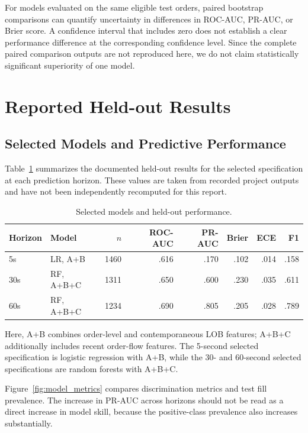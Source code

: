 \documentclass[11pt,a4paper]{article}
\begin{document}
For models evaluated on the same eligible test orders, paired
bootstrap comparisons can quantify uncertainty in differences
in ROC-AUC, PR-AUC, or Brier score. A confidence interval that
includes zero does not establish a clear performance difference
at the corresponding confidence level. Since the complete
paired comparison outputs are not reproduced here, we do not
claim statistically significant superiority of one model.

\section{Reported Held-out Results}

\subsection{Selected Models and Predictive Performance}

Table~\ref{tab:heldout_results} summarizes the documented
held-out results for the selected specification at each
prediction horizon. These values are taken from recorded
project outputs and have not been independently recomputed
for this report.

\begin{table}[htbp]
\centering
\caption{Selected models and held-out performance.}
\label{tab:heldout_results}
\small
\setlength{\tabcolsep}{4pt}
\begin{tabular}{llrrrrrr}
\toprule
Horizon & Model & $n$ & ROC-AUC & PR-AUC & Brier & ECE & F1 \\
\midrule
5s & LR, A+B & 1460 & .616 & .170 & .102 & .014 & .158 \\
30s & RF, A+B+C & 1311 & .650 & .600 & .230 & .035 & .611 \\
60s & RF, A+B+C & 1234 & .690 & .805 & .205 & .028 & .789 \\
\bottomrule
\end{tabular}
\end{table}

Here, A+B combines order-level and contemporaneous LOB
features; A+B+C additionally includes recent order-flow
features. The 5-second selected specification is logistic
regression with A+B, while the 30- and 60-second selected
specifications are random forests with A+B+C.

Figure~\ref{fig:model_metrics} compares discrimination
metrics and test fill prevalence. The increase in PR-AUC
across horizons should not be read as a direct increase in
model skill, because the positive-class prevalence also
increases substantially.
\end{document}
